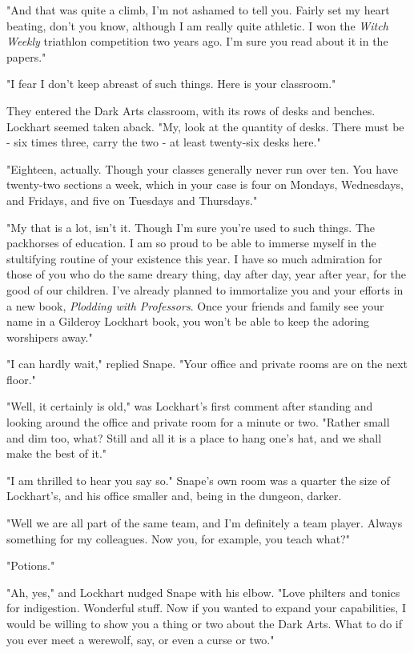 \documentclass[a4paper,11pt]{article}
\begin{document}
"And that was quite a climb, I'm not ashamed to tell you. Fairly set my heart beating, don't you know, although I am really quite athletic. I won the \emph{Witch Weekly} triathlon competition two years ago. I'm sure you read about it in the papers."

"I fear I don't keep abreast of such things. Here is your classroom."

They entered the Dark Arts classroom, with its rows of desks and benches. Lockhart seemed taken aback. "My, look at the quantity of desks. There must be - six times three, carry the two - at least twenty-six desks here."

"Eighteen, actually. Though your classes generally never run over ten. You have twenty-two sections a week, which in your case is four on Mondays, Wednesdays, and Fridays, and five on Tuesdays and Thursdays."

"My that is a lot, isn't it. Though I'm sure you're used to such things. The packhorses of education. I am so proud to be able to immerse myself in the stultifying routine of your existence this year. I have so much admiration for those of you who do the same dreary thing, day after day, year after year, for the good of our children. I've already planned to immortalize you and your efforts in a new book, \emph{Plodding with Professors}. Once your friends and family see your name in a Gilderoy Lockhart book, you won't be able to keep the adoring worshipers away."

"I can hardly wait," replied Snape. "Your office and private rooms are on the next floor."

"Well, it certainly is old," was Lockhart's first comment after standing and looking around the office and private room for a minute or two. "Rather small and dim too, what? Still and all it is a place to hang one's hat, and we shall make the best of it."

"I am thrilled to hear you say so." Snape's own room was a quarter the size of Lockhart's, and his office smaller and, being in the dungeon, darker.

"Well we are all part of the same team, and I'm definitely a team player. Always something for my colleagues. Now you, for example, you teach what?"

"Potions."

"Ah, yes," and Lockhart nudged Snape with his elbow. "Love philters and tonics for indigestion. Wonderful stuff. Now if you wanted to expand your capabilities, I would be willing to show you a thing or two about the Dark Arts. What to do if you ever meet a werewolf, say, or even a curse or two."
\end{document}
